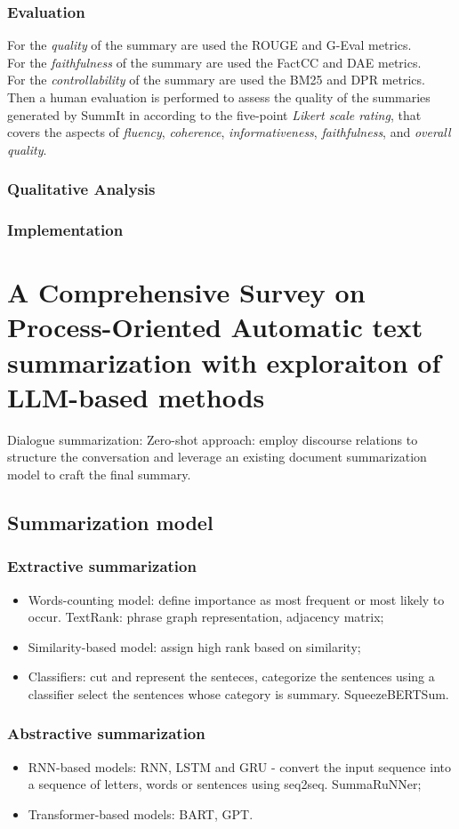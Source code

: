 \documentclass[12pt]{article}
\begin{document}
\subsubsection{Evaluation}
\label{subsubsec:SummIt_evaluation}

For the \emph{quality} of the summary are used the ROUGE and G-Eval metrics. \\
For the \emph{faithfulness} of the summary are used the FactCC and DAE metrics. \\ 
For the \emph{controllability} of the summary are used the BM25 and DPR metrics. \\
Then a human evaluation is performed to assess the quality of the summaries generated by SummIt in according to the five-point \emph{Likert scale rating}, that covers the aspects of \emph{fluency}, \emph{coherence}, \emph{informativeness}, \emph{faithfulness}, and \emph{overall quality}.

\subsubsection{Qualitative Analysis}
\label{subsubsec:SummIt_qualitative_analysis}



\subsubsection{Implementation}
\label{subsubsec:SummIt_implementation}

\section{A Comprehensive Survey on Process-Oriented Automatic text summarization with exploraiton of LLM-based methods}
Dialogue summarization: Zero-shot approach: employ discourse relations to structure the conversation and leverage an existing document summarization model to craft the final summary. 
\subsection{Summarization model}
\subsubsection{Extractive summarization}
\begin{itemize}
    \item Words-counting model: define importance as most frequent or most likely to occur. TextRank: phrase graph representation, adjacency matrix;
    \item Similarity-based model: assign high rank based on similarity;
    \item Classifiers: cut and represent the senteces, categorize the sentences using a classifier select the sentences whose category is summary. SqueezeBERTSum.
\end{itemize}
\subsubsection{Abstractive summarization}
\begin{itemize}
    \item RNN-based models: RNN, LSTM and GRU - convert the input sequence into a sequence of letters, words or sentences using seq2seq. SummaRuNNer;
    \item Transformer-based models: BART, GPT.
\end{itemize}
\end{document}
